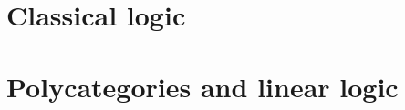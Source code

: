 \begin{props}

\end{props}

\section{Classical logic}
\label{sec:classical}



\section{Polycategories and linear logic}
\label{sec:cllin}



